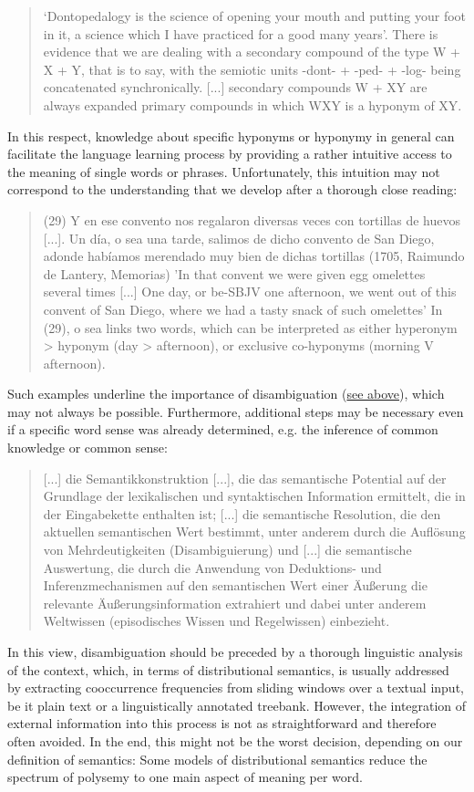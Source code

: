 \documentclass[jou]{apa6} %
\begin{document}
\blockquote[{\cite[p.~43]{souille-rigautSemanticAccountQuasiLexemes2010}}]{‘Dontopedalogy is the science of opening your mouth and putting your foot in it, a science which I have practiced for a good many years’. There is evidence that we are dealing with a secondary compound of the type W + X + Y, that is to say, with the semiotic units -dont- + -ped- + -log- being concatenated synchronically. [...] secondary compounds W + XY are always expanded primary compounds in which WXY is a hyponym of XY.}
In this respect, knowledge about specific hyponyms or hyponymy in general can facilitate the language learning process by providing a rather intuitive access to the meaning of single words or phrases. Unfortunately, this intuition may not correspond to the understanding that we develop after a thorough close reading:
\blockquote[{\cite[p.~126]{ponsborderiaPathsGrammaticalizationSpanish2014}}]{(29) Y en ese convento nos regalaron diversas veces con tortillas de huevos [...]. Un día, o sea una tarde, salimos de dicho convento de San Diego, adonde habíamos merendado muy bien de dichas tortillas (1705, Raimundo de Lantery, Memorias)
'In that convent we were given egg omelettes several times [...] One day, or be-SBJV one afternoon, we went out of this convent of San Diego, where we had a tasty snack of such omelettes'
In (29), o sea links two words, which can be interpreted as either hyperonym > hyponym (day > afternoon), or exclusive co-hyponyms (morning V afternoon).}
Such examples underline the importance of disambiguation (\hyperlink{polysemyProblemForSemanticRelations}{see above}), which may not always be possible. Furthermore, additional steps may be necessary even if a specific word sense was already determined, e.g. the inference of common knowledge or common sense:
\blockquote[{\cite[p.~427f.]{pinkalSemantik1993}}]{[...] die Semantikkonstruktion [...], die das semantische Potential auf der Grundlage der lexikalischen und syntaktischen Information ermittelt, die in der Eingabekette enthalten ist; [...] die semantische Resolution, die den aktuellen semantischen Wert bestimmt, unter anderem durch die Auflösung von Mehrdeutigkeiten (Disambiguierung) und [...] die semantische Auswertung, die durch die Anwendung von Deduktions- und Inferenzmechanismen auf den semantischen Wert einer Äußerung die relevante Äußerungsinformation extrahiert und dabei unter anderem Weltwissen (episodisches Wissen und Regelwissen) einbezieht.}
In this view, disambiguation should be preceded by a thorough linguistic analysis of the context, which, in terms of distributional semantics, is usually addressed by extracting cooccurrence frequencies from sliding windows over a textual input, be it plain text or a linguistically annotated treebank. However, the integration of external information into this process is not as straightforward and therefore often avoided. In the end, this might not be the worst decision, depending on our definition of semantics: Some models of distributional semantics reduce the spectrum of polysemy to one main aspect of meaning per word.
\end{document}
